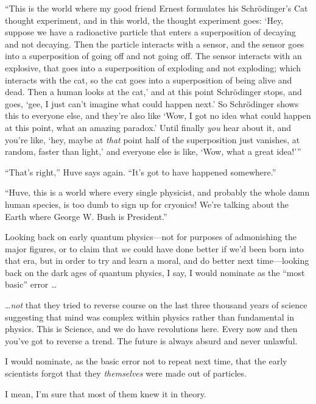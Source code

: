 {
 ``This is the world where my good friend Ernest
formulates his Schrödinger's Cat thought experiment,
and in this world, the thought experiment goes: `Hey,
suppose we have a radioactive particle that enters a superposition of
decaying and not decaying. Then the particle interacts with a sensor,
and the sensor goes into a superposition of going off and not going
off. The sensor interacts with an explosive, that goes into a
superposition of exploding and not exploding; which interacts with the
cat, so the cat goes into a superposition of being alive and dead. Then
a human looks at the cat,' and at this point
Schrödinger stops, and goes, `gee, I just
can't imagine what could happen next.'
So Schrödinger shows this to everyone else, and they're
also like `Wow, I got no idea what could happen at this
point, what an amazing paradox.' Until finally
\textit{you} hear about it, and you're like,
`hey, maybe at \textit{that} point half of the
superposition just vanishes, at random, faster than
light,' and everyone else is like, `Wow,
what a great idea!'''}

{
 ``That's
right,'' Huve says again.
``It's got to have happened
somewhere.''}

{
 ``Huve, this is a world where every single
physicist, and probably the whole damn human species, is too dumb to
sign up for cryonics! We're talking about the Earth
where George W. Bush is President.''}

\myendsectiontext


{
 Looking back on early quantum physics---not for purposes of
admonishing the major figures, or to claim that \textit{we} could have
done better if we'd been born into that era, but in
order to try and learn a moral, and do better next time---looking back
on the dark ages of quantum physics, I say, I would nominate as the
``most basic'' error \ldots}

{
 \ldots \textit{not} that they tried to reverse course on the last
three thousand years of science suggesting that mind was complex within
physics rather than fundamental in physics. This is Science, and we do
have revolutions here. Every now and then you've got to
reverse a trend. The future is always absurd and never unlawful.}

{
 I would nominate, as the basic error not to repeat next time, that
the early scientists forgot that they \textit{themselves} were made out
of particles.}

{
 I mean, I'm sure that most of them knew it in
theory.}

